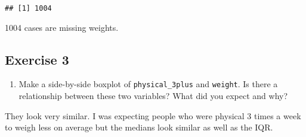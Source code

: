 \documentclass[
]{article}
\newenvironment{Shaded}{\begin{snugshade}}{\end{snugshade}}
\newcommand{\DataTypeTok}[1]{\textcolor[rgb]{0.13,0.29,0.53}{#1}}
\newcommand{\DecValTok}[1]{\textcolor[rgb]{0.00,0.00,0.81}{#1}}
\newcommand{\KeywordTok}[1]{\textcolor[rgb]{0.13,0.29,0.53}{\textbf{#1}}}
\newcommand{\NormalTok}[1]{#1}
\newcommand{\OperatorTok}[1]{\textcolor[rgb]{0.81,0.36,0.00}{\textbf{#1}}}
\newcommand{\StringTok}[1]{\textcolor[rgb]{0.31,0.60,0.02}{#1}}
\providecommand{\tightlist}{%
  \setlength{\itemsep}{0pt}\setlength{\parskip}{0pt}}
\begin{document}
\begin{verbatim}
## [1] 1004
\end{verbatim}

1004 cases are missing weights.

\begin{Shaded}
\end{Shaded}

\hypertarget{exercise-3}{%
\subsection{Exercise 3}\label{exercise-3}}

\begin{enumerate}
\def\labelenumi{\arabic{enumi}.}
\tightlist
\item
  Make a side-by-side boxplot of \texttt{physical\_3plus} and
  \texttt{weight}. Is there a relationship between these two variables?
  What did you expect and why?
\end{enumerate}

They look very similar. I was expecting people who were physical 3 times
a week to weigh less on average but the medians look similar as well as
the IQR.

\begin{Shaded}
\end{Shaded}
\end{document}
